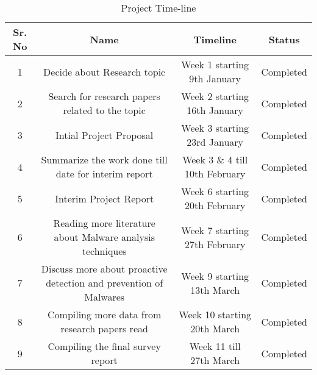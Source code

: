 \documentclass[11pt]{article}
\begin{document}
	\begin{table}
		\centering
		\begin{tabular}{cccc}
			\hline
			Sr. No & Name & Timeline & Status\\
			\hline
			1 & Decide about Research topic  & Week 1 starting 9th January & Completed\\
			\hline
			2 & Search for research papers related to the topic & Week 2 starting 16th January & Completed\\
			\hline
			3 & Intial Project Proposal & Week 3 starting 23rd January & Completed\\
			\hline
			4 & Summarize the work done till date for interim report & Week 3 \& 4 till 10th February & Completed\\
			\hline
			5 & Interim Project Report  & Week 6 starting 20th February  & Completed\\
			\hline
			6 & Reading more literature about Malware analysis techniques & Week 7 starting 27th February & Completed\\
			\hline
			7 & Discuss more about proactive detection and prevention of Malwares & Week 9 starting 13th March & Completed\\
			\hline
			8 & Compiling more data from research papers read & Week 10 starting 20th March & Completed\\
			\hline
			9 & Compiling the final survey report & Week 11 till 27th March & Completed\\
			\hline
		\end{tabular}
	\caption[]{Project Time-line}
	\label{tab:timeline}
	\end{table}


\end{document}

